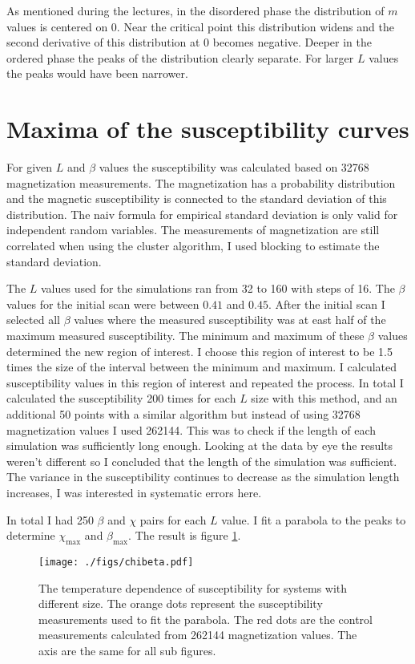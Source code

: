 \documentclass[pdftex,12pt,a4paper]{article}
\begin{document}
As mentioned during the lectures, in the disordered phase the distribution of $m$ values is centered on 0. Near the critical point this distribution widens and the second derivative of this distribution at 0 becomes negative. Deeper in the ordered phase the peaks of the distribution clearly separate. For larger $L$ values the peaks would have been narrower.

\section{Maxima of the susceptibility curves}

For given $L$ and $\beta$ values the susceptibility was calculated based on 32768 magnetization measurements. The magnetization has a probability distribution and the magnetic susceptibility is connected to the standard deviation of this distribution. The naiv formula for empirical standard deviation is only valid for independent random variables. The measurements of magnetization are still correlated when using the cluster algorithm, I used blocking to estimate the standard deviation. 

The $L$ values used for the simulations ran from 32 to 160 with steps of 16. The $\beta$ values for the initial scan were between $0.41$ and $0.45$. After the initial scan I selected all $\beta$ values where the measured susceptibility was at east half of the maximum measured susceptibility. The minimum and maximum of these $\beta$ values determined the new region of interest. I choose this region of interest to be 1.5 times the size of the interval between the minimum and maximum. I calculated susceptibility values in this region of interest and repeated the process. In total I calculated the susceptibility 200 times for each $L$ size with this method, and an additional 50 points with a similar algorithm but instead of using 32768 magnetization values I used 262144. This was to check if the length of each simulation was sufficiently long enough. Looking at the data by eye the results weren't different so I concluded that the length of the simulation was sufficient. The variance in the susceptibility continues to decrease as the simulation length increases, I was interested in systematic errors here.

In total I had 250 $\beta$ and $\chi$ pairs for each $L$ value. I fit a parabola to the peaks to determine $\chi_{\mathrm{max}}$ and $\beta_{\mathrm{max}}$. The result is figure \ref{chibeta}.

\begin{figure}[H]
	\centering
	\texttt{[image: ./figs/chibeta.pdf]}
	\caption{The temperature dependence of susceptibility for systems with different size. The orange dots represent the susceptibility measurements used to fit the parabola. The red dots are the control measurements calculated from 262144 magnetization values. The axis are the same for all sub figures.}
	\label{chibeta}
\end{figure}
\end{document}
